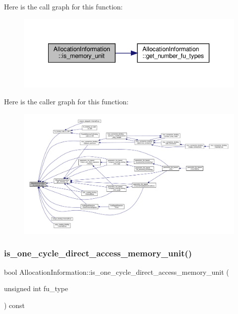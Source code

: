 Here is the call graph for this function\+:
\nopagebreak
\begin{figure}[H]
\begin{center}
\leavevmode
\includegraphics[width=340pt]{d7/d79/classAllocationInformation_aff3cc55dcb47a850812a142dc9b1b6b9_cgraph}
\end{center}
\end{figure}
Here is the caller graph for this function\+:
\nopagebreak
\begin{figure}[H]
\begin{center}
\leavevmode
\includegraphics[width=350pt]{d7/d79/classAllocationInformation_aff3cc55dcb47a850812a142dc9b1b6b9_icgraph}
\end{center}
\end{figure}
\mbox{\label{classAllocationInformation_a0770d67171506fb5f5c27a3d5c57f174}} 
\subsubsection{\texorpdfstring{is\+\_\+one\+\_\+cycle\+\_\+direct\+\_\+access\+\_\+memory\+\_\+unit()}{is\_one\_cycle\_direct\_access\_memory\_unit()}}
{\footnotesize\ttfamily bool Allocation\+Information\+::is\+\_\+one\+\_\+cycle\+\_\+direct\+\_\+access\+\_\+memory\+\_\+unit (\begin{DoxyParamCaption}\item[{unsigned int}]{fu\+\_\+type }\end{DoxyParamCaption}) const}



